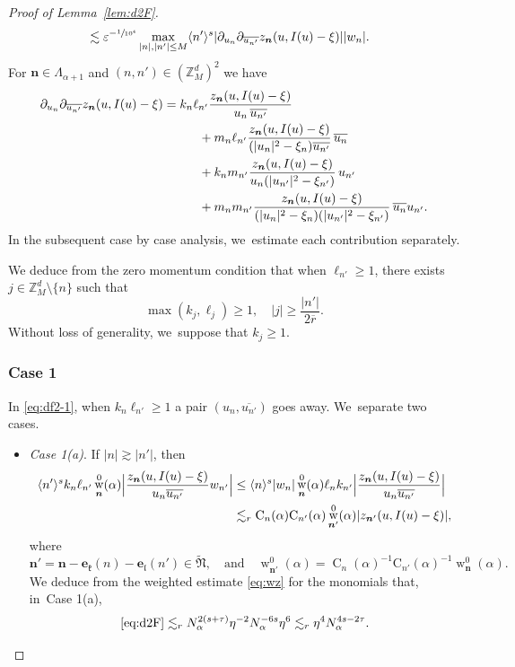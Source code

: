 \documentclass[JEP,XML,SOM,Unicode,published]{cedram}
\DeclareMathOperator{\rw}{w}
\theoremstyle{plain}
\theoremstyle{definition}
\newcommand{\nb}{{\boldsymbol n}}
\newcommand{\Nb}{{\boldsymbol{\mathfrak{N}}}}
\newcommand{\Z}{\mathbb{Z}}
\newcommand{\1}{\mathbf{1}}
\let\epsilon\varepsilon
\begin{document}
\begin{proof}[Proof of Lemma~\ref{lem:d2F}]
\begin{align}
\label{eq:wasa}
&\lesssim \epsilon^{-\sfrac{1}{10^{4}}}
\max_{|n|,|n'|\leq M}
\langle n'\rangle^{s}
|\partial_{u_{n}}\partial_{\overline{u_{n'}}}z_{\nb}(u,I(u)-\xi)|
|w_{n}|.
\end{align}
For $\nb\in\Lambda_{\alpha+1}$ and $(n,n')\in(\Z_{M}^{d})^{2}$ we have
\begin{align}
\label{eq:df2-1}
\partial_{u_n}\partial_{\overline{u_{n'}}}
z_{\nb}(u,I(u)-\xi)
&= k_{n}\ell_{n'}
\frac{z_{\nb}(u,I(u)-\xi)}{u_{n}\,\overline{u_{n'}}}\\
\label{eq:df2-2}
&\hspace*{1cm}+m_n\ell_{n'}
\frac{z_{\nb}(u,I(u)-\xi)}{(|u_{n}|^{2}-\xi_{n})\overline{u_{n'}}}\,\overline{u_{n}}\\
\label{eq:df2-3}
&
\hspace*{1cm}+k_{n}m_{n'}
\frac{z_{\nb}(u,I(u)-\xi)}{u_{n}(|u_{n'}|^{2}-\xi_{n'})}\,
u_{n'}\\
\label{eq:df2-4}
&\hspace*{1cm}+m_nm_{n'}
\frac{z_{\nb}(u,I(u)-\xi)}{(|u_{n}|^{2}-\xi_{n})(|u_{n'}|^{2}-\xi_{n'})}\,
\overline{u_{n}}u_{n'}.
\end{align}
In the subsequent case by case analysis, we~estimate each contribution separately.

We deduce from the zero momentum condition that when $\ell_{n'}\geq1$, there exists
$j\in\Z_{M}^{d}\setminus\{n\}$ such that
\begin{equation}
\label{eq:j}
\max(k_j,\ell_{j})\geq1,\quad |j|\geq\frac{|n'|}{2\overline{r}}.
\end{equation}
Without loss of generality, we~suppose that $k_{j}\geq1$.

\subsubsection*{Case 1} In \eqref{eq:df2-1}, when $k_{n}\ell_{n'}\geq1$ a pair $(u_{n},\overline{u_{n'}})$ goes away. We~separate two cases.
\begin{itemize}
\item
\textit{Case 1(a)}. If
$
|n|\gtrsim |n'|
$,
then
\begin{align*}
\langle n'\rangle^{s}
k_{n}\ell_{n'}
\rw_{\nb}^{0}(\alpha)
\Bigl|
\frac{z_{\nb}(u,I(u)-\xi)}{u_{n}\overline{u_{n'}}}
w_{n'}
\Bigr|
&\leq \langle n\rangle^{s}|w_{n}|\rw_{\nb}^{0}(\alpha)\ell_nk_{n'}\Bigl|\frac{z_{\nb}(u,I(u)-\xi)}{u_{n}\overline{u_{n'}}}\Bigr| \\
&\lesssim_{r}
\operatorname{C}_{n}(\alpha)\mathrm{C}_{n'}(\alpha)
\rw_{\nb'}^{0}(\alpha)
|z_{\nb'}(u,I(u)-\xi)|,
\end{align*}
where
\[
\nb' =
\nb - \boldsymbol{e}_{\mathfrak{k}}(n)-\boldsymbol{e}_{\mathfrak{l}}(n') \in \widetilde{\Nb},\quad\text{and}\quad \rw_{\nb'}^{0}(\alpha)
= \operatorname{C}_{n}(\alpha)^{-1}
\mathrm{C}_{n'}(\alpha)^{-1}
\rw_{\nb}^{0}(\alpha).
\]
We deduce from the weighted estimate \eqref{eq:wz} for the monomials that, in~Case 1(a),
\[
\eqref{eq:d2F}\lesssim_{r}
N_{\alpha}^{2(s+\tau)}
\eta^{-2} N_{\alpha}^{-6s}\eta^{6} \lesssim_{r} \eta^{4}N_{\alpha}^{4s-2\tau}.
\]


\end{itemize}
\end{proof}
\end{document}
